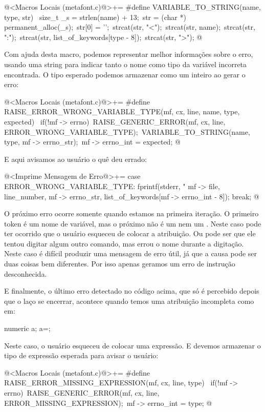 \iniciocodigo
@<Macros Locais (metafont.c)@>+=
#define VARIABLE_TO_STRING(name, type, str) {\
  size_t _s = strlen(name) + 13;\
  str = (char *) permanent_alloc(_s);\
  str[0] = '\0';\
  strcat(str, "<");\
  strcat(str, name);\
  strcat(str, ":");\
  strcat(str, list_of_keywords[type - 8]);\
  strcat(str, ">");}
@
\fimcodigo

Com ajuda desta macro, podemos representar melhor informações sobre o
erro, usando uma string para indicar tanto o nome como tipo da
variável incorreta encontrada. O tipo esperado podemos armazenar como
um inteiro ao gerar o erro:

\iniciocodigo
@<Macros Locais (metafont.c)@>+=
#define RAISE_ERROR_WRONG_VARIABLE_TYPE(mf, cx, line, name, type, expected) {\
  if(!mf -> errno){\
    RAISE_GENERIC_ERROR(mf, cx, line, ERROR_WRONG_VARIABLE_TYPE);\
    VARIABLE_TO_STRING(name, type, mf -> errno_str);\
    mf -> errno_int = expected;}}
@
\fimcodigo

E aqui avisamos ao usuário o quê deu errado:

\iniciocodigo
@<Imprime Mensagem de Erro@>+=
case ERROR_WRONG_VARIABLE_TYPE:
  fprintf(stderr, "%
          mf -> file, line_number, mf -> errno_str,
          list_of_keywords[mf -> errno_int - 8]);
  break;
@
\fimcodigo

O próximo erro ocorre somente quando estamos na primeira iteração. O
primeiro token é um nome de variável, mas o próximo não é
um \monoespaco{=} nem um \monoespaco{:=}. Neste caso pode ter ocorrido
que o usuário esqueceu de colocar a atribuição. Ou pode ser que ele
tentou digitar algum outro comando, mas errou o nome durante a
digitação. Neste caso é difícil produzir uma mensagem de erro útil, já
que a causa pode ser duas coisas bem diferentes. Por isso apenas
geramos um erro de instrução desconhecida.

E finalmente, o último erro detectado no código acima, que só é
percebido depois que o laço se encerrar, acontece quando temos uma
atribuição incompleta como em:

\alinhaverbatim
numeric a;
a=;
\alinhanormal

Neste caso, o usuário esqueceu de colocar uma expressão. E devemos
armazenar o tipo de expressão esperada para avisar o usuário:

\iniciocodigo
@<Macros Locais (metafont.c)@>+=
#define RAISE_ERROR_MISSING_EXPRESSION(mf, cx, line, type) {\
  if(!mf -> errno){\
    RAISE_GENERIC_ERROR(mf, cx, line, ERROR_MISSING_EXPRESSION);\
    mf -> errno_int = type;}}
@
\fimcodigo


